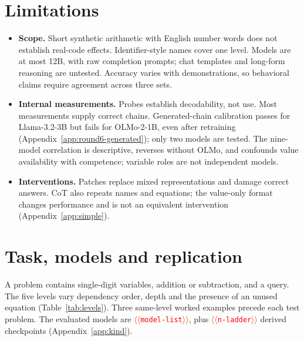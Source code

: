 \documentclass[11pt]{article}
\providecommand{\NUM}[1]{\textcolor{red}{$\langle\langle$\texttt{#1}$\rangle\rangle$}}
\begin{document}
\section*{Limitations}

\begin{itemize}
\item \textbf{Scope.} Short synthetic arithmetic with English number words does not establish
real-code effects. Identifier-style names cover one level. Models are at most 12B, with raw
completion prompts; chat templates and long-form reasoning are untested. Accuracy varies
with demonstrations, so behavioral claims require agreement across three sets.
\item \textbf{Internal measurements.} Probes establish decodability, not use. Most measurements
supply correct chains. Generated-chain calibration passes for Llama-3.2-3B but fails for
OLMo-2-1B, even after retraining (Appendix~\ref{app:round6-generated}); only two models are tested.
The nine-model correlation is descriptive, reverses without OLMo, and confounds value
availability with competence; variable roles are not independent models.
\item \textbf{Interventions.} Patches replace mixed representations and damage correct answers.
CoT also repeats names and equations; the value-only format changes performance and is not
an equivalent intervention (Appendix~\ref{app:simple}).
\end{itemize}



\appendix

\section{Task, models and replication}
\label{app:task}
A problem contains single-digit variables, addition or subtraction, and a query. The five
levels vary dependency order, depth and the presence of an unused equation
(Table~\ref{tab:levels}). Three same-level worked examples precede each test problem.
The evaluated models are \NUM{model-list}, plus \NUM{n-ladder} derived checkpoints
(Appendix~\ref{app:kind}).
\end{document}
